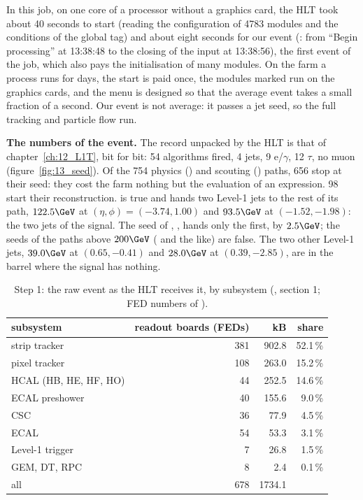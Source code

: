 \begin{plainwords}
In this job, on one core of a processor without a graphics card, the HLT took about 40 seconds to start (reading the
configuration of 4783 modules and the conditions of the global tag) and about eight seconds for our event
(: from ``Begin processing'' at 13:38:48 to the closing of the input at 13:38:56), the first
event of the job, which also pays the initialisation of many modules. On the farm a process runs for days, the start
is paid once, the modules marked  run on the graphics cards, and the menu is designed so that the
average event takes a small fraction of a second. Our event is not average: it passes a jet seed, so the full
tracking and particle flow run.
\end{plainwords}

\textbf{The numbers of the event.} The record unpacked by the HLT is that of chapter~\ref{ch:12_L1T}, bit for bit:
54 algorithms fired, 4 jets, 9 e/$\gamma$, 12 $\tau$, no muon (figure~\ref{fig:13_seed}). Of the 754 physics
() and scouting () paths, 656 stop at their seed: they cost the farm nothing but the
evaluation of an expression. 98 start their reconstruction.  is true and hands two Level-1
jets to the rest of its path, $122.5\GeV$ at $(\eta,\phi)=(-3.74,1.00)$ and $93.5\GeV$ at $(-1.52,-1.98)$: the two
jets of the signal. The seed of , , hands only the first, by $2.5\GeV$; the
seeds of the paths above $200\GeV$ ( and the like) are false. The two other Level-1 jets,
$39.0\GeV$ at $(0.65,-0.41)$ and $28.0\GeV$ at $(0.39,-2.85)$, are in the barrel where the signal has nothing.

\begin{table}[!htb]
\centering\small
\caption{Step 1: the raw event as the HLT receives it, by subsystem (, section 1; FED
numbers of ).}
\label{tab:13_raw}
\begin{tabular}{l rrr}
\toprule
subsystem & readout boards (FEDs) & kB & share \\
\midrule
strip tracker & 381 & 902.8 & 52.1\,\% \\
pixel tracker & 108 & 263.0 & 15.2\,\% \\
HCAL (HB, HE, HF, HO) & 44 & 252.5 & 14.6\,\% \\
ECAL preshower & 40 & 155.6 & 9.0\,\% \\
CSC & 36 & 77.9 & 4.5\,\% \\
ECAL & 54 & 53.3 & 3.1\,\% \\
Level-1 trigger & 7 & 26.8 & 1.5\,\% \\
GEM, DT, RPC & 8 & 2.4 & 0.1\,\% \\
\midrule
all & 678 & 1734.1 & \\
\bottomrule
\end{tabular}
\end{table}

